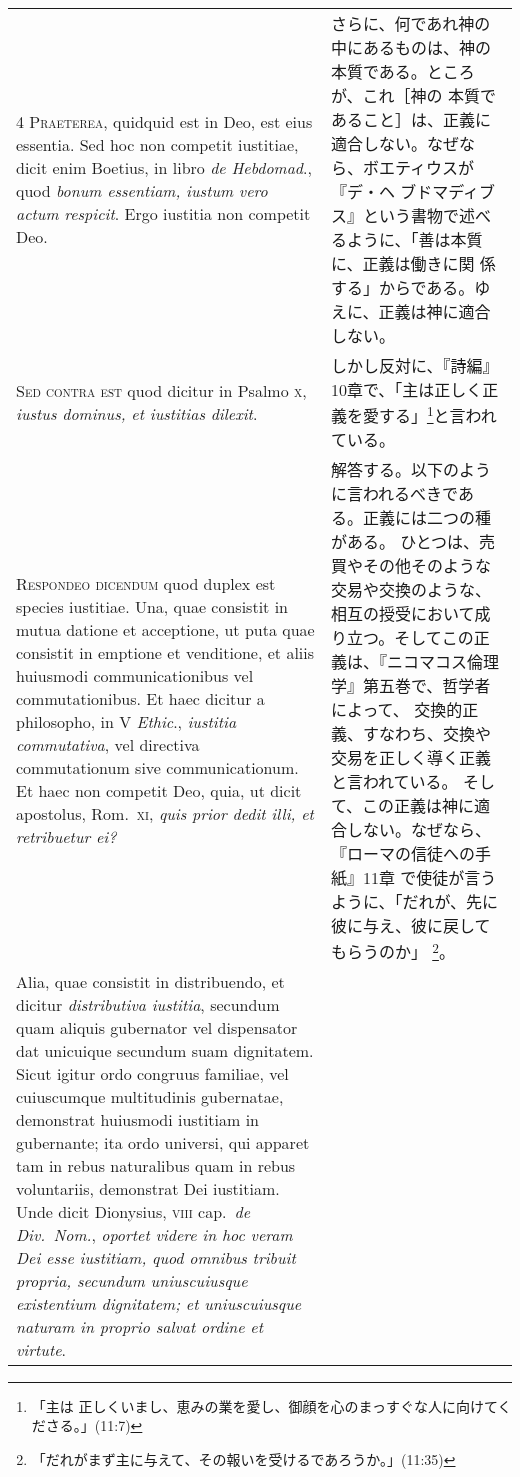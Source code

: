 \documentclass[10pt]{jsarticle} %
\begin{document}
{\begin{longtable}{p{21em}p{21em}}
\\


{\scshape 4 Praeterea}, quidquid est in Deo, est eius
essentia. Sed hoc non competit iustitiae, dicit enim Boetius, in libro
{\itshape de Hebdomad}., quod {\itshape bonum essentiam, iustum vero actum respicit}. Ergo
iustitia non competit Deo.

&


さらに、何であれ神の中にあるものは、神の本質である。ところが、これ［神の
 本質であること］は、正義に適合しない。なぜなら、ボエティウスが『デ・ヘ
 ブドマディブス』という書物で述べるように、「善は本質に、正義は働きに関
 係する」からである。ゆえに、正義は神に適合しない。

\\


{\scshape Sed contra est} quod dicitur in Psalmo {\scshape x},
{\itshape iustus dominus, et iustitias dilexit}.

&

しかし反対に、『詩編』10章で、「主は正しく正義を愛する」\footnote{「主は
 正しくいまし、恵みの業を愛し、御顔を心のまっすぐな人に向けてくださる。」(11:7)}と言われている。

\\


{\scshape Respondeo dicendum} quod duplex est species
iustitiae. Una, quae consistit in mutua datione et acceptione, ut puta
quae consistit in emptione et venditione, et aliis huiusmodi
communicationibus vel commutationibus. Et haec dicitur a philosopho, in
V {\itshape Ethic}., {\itshape iustitia commutativa}, vel directiva commutationum sive
communicationum. Et haec non competit Deo, quia, ut dicit apostolus,
Rom.~{\scshape xi}, {\itshape quis prior dedit illi, et retribuetur ei?} 

&

解答する。以下のように言われるべきである。正義には二つの種がある。
ひとつは、売買やその他そのような交易や交換のような、相互の授受において成
 り立つ。そしてこの正義は、『ニコマコス倫理学』第五巻で、哲学者によって、
 交換的正義、すなわち、交換や交易を正しく導く正義と言われている。
そして、この正義は神に適合しない。なぜなら、『ローマの信徒への手紙』11章
 で使徒が言うように、「だれが、先に彼に与え、彼に戻してもらうのか」
 \footnote{「だれがまず主に与えて、その報いを受けるであろうか。」(11:35)}。


\\

Alia, quae consistit
in distribuendo, et dicitur {\itshape distributiva iustitia}, secundum quam aliquis
gubernator vel dispensator dat unicuique secundum suam dignitatem. Sicut
igitur ordo congruus familiae, vel cuiuscumque multitudinis gubernatae,
demonstrat huiusmodi iustitiam in gubernante; ita ordo universi, qui
apparet tam in rebus naturalibus quam in rebus voluntariis, demonstrat
Dei iustitiam. Unde dicit Dionysius, {\scshape viii} cap.~{\itshape de Div.~Nom.}, {\itshape oportet
videre in hoc veram Dei esse iustitiam, quod omnibus tribuit propria,
secundum uniuscuiusque existentium dignitatem; et uniuscuiusque naturam
in proprio salvat ordine et virtute}.


\end{longtable}}
\end{document}
